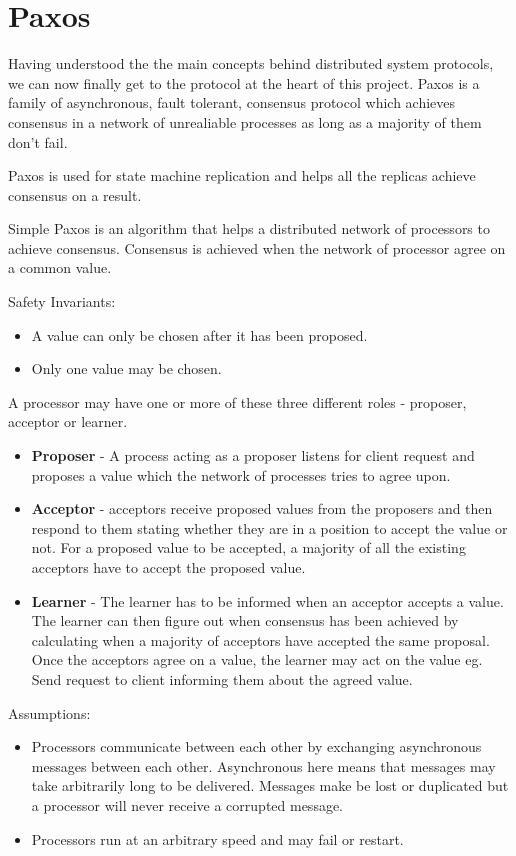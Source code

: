 \section{Paxos}
Having understood the the main concepts behind distributed system protocols, we can
now finally get to the protocol at the heart of this project. Paxos is a family of
asynchronous, fault tolerant, consensus protocol which achieves consensus in a network
of unrealiable processes as long as a majority of them don't fail.

Paxos is used for state machine replication and helps all the replicas achieve
consensus on a result.

Simple Paxos is an algorithm that helps a distributed network of processors to achieve consensus.
Consensus is achieved when the network of processor agree on a common value.

Safety Invariants:
\begin{itemize}
  \item A value can only be chosen after it has been proposed.
  \item Only one value may be chosen.
\end{itemize}

A processor may have one or more of these three different roles - proposer, acceptor or learner.
\begin{itemize}
  \item \textbf{Proposer} - A process acting as a proposer listens for client
    request and proposes a value which the network of processes tries to agree upon.
  \item \textbf{Acceptor} - acceptors receive proposed values from the proposers
    and then respond to them stating whether they are in a position to accept the value or not.
    For a proposed value to be accepted, a majority of all the existing acceptors have to accept the proposed value.
  \item \textbf{Learner} - The learner has to be informed when an acceptor accepts a value.
    The learner can then figure out when consensus has been achieved by calculating
    when a majority of acceptors have accepted the same proposal.
    Once the acceptors agree on a value, the learner may act on the value
    eg. Send request to client informing them about the agreed value.
\end{itemize}


Assumptions:
\begin{itemize}
  \item Processors communicate between each other by exchanging asynchronous messages between each other.
    Asynchronous here means that messages may take arbitrarily long to be delivered.
    Messages make be lost or duplicated but a processor will never receive a corrupted message.
  \item Processors run at an arbitrary speed and may fail or restart.
\end{itemize}

